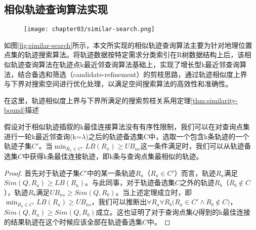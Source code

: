 \subsection{相似轨迹查询算法实现}
\label{subsec:algorithm implementation}

\begin{figure}[!htp]
  \centering
  \texttt{[image: chapter03/similar-search.png]}
\end{figure}

如图\ref{fig:similar-search}所示，本文所实现的相似轨迹查询算法主要为针对地理位置点集的轨迹搜索算法\cite{qi2015efficient}。将轨迹数据按特定需求分类索引在R树数据结构上后，该相似轨迹查询算法在轨迹点k最近邻查询算法\cite{roussopoulos1995nearest}基础上，实现了增长型k最近邻查询算法\cite{chen2010searching}，结合备选和筛选（candidate-refinement）的剪枝思路\cite{tang2011retrieving}，通过轨迹相似度上界与下界对搜索空间进行优化处理，以满足空间搜索算法的高效性和准确性。

在这里，轨迹相似度上界与下界所满足的搜索剪枝关系用定理\ref{thm:similarity-bound}描述

\begin{thm}[相似度上下界]
	\label{thm:similarity-bound}
	假设对于相似轨迹插叙的k最佳连接算法没有有序性限制，我们可以在对查询点集进行一轮k最近邻查询(k=$\lambda$)之后的轨迹备选集C中，选取一个包含k条轨迹的一个轨迹子集$C'$。当$\min_{R_{x}\in C'}{LB(R_{x})}\geq UB_{us}$这一条件满足时，我们可以从轨迹备选集$C$中获得k条最佳连接轨迹，即k条与查询点集最相似的轨迹。
	\begin{proof}
	首先对于轨迹子集$C'$中的某一条轨迹$R_{a}$（$R_{a} \in C'$）而言，轨迹$R_{a}$满足$Sim(Q,R_{a}) \geq LB(R_{a})$。与此同事，对于轨迹备选集$C$之外的轨迹$R_{b}$（$R_{b} \notin C$），轨迹$R_{b}$满足$UB_{ns} \geq Sim(Q,R_{b})$。当上述定理成立时，即$\min_{R_{a}\in C'}{LB(R_{a})}\geq UB_{ns}$，我们可以推断出$\forall R_{a}\forall R_{b} \big( R_{a} \in C' \wedge R_{b} \notin C \big)$，$Sim(Q,R_{a}) \geq Sim(Q,R_{b})$成立。这也证明了对于查询点集$Q$得到的k最佳连接的结果轨迹在这个时候应该全部在轨迹备选集$C$中。
	\end{proof}
\end{thm}

